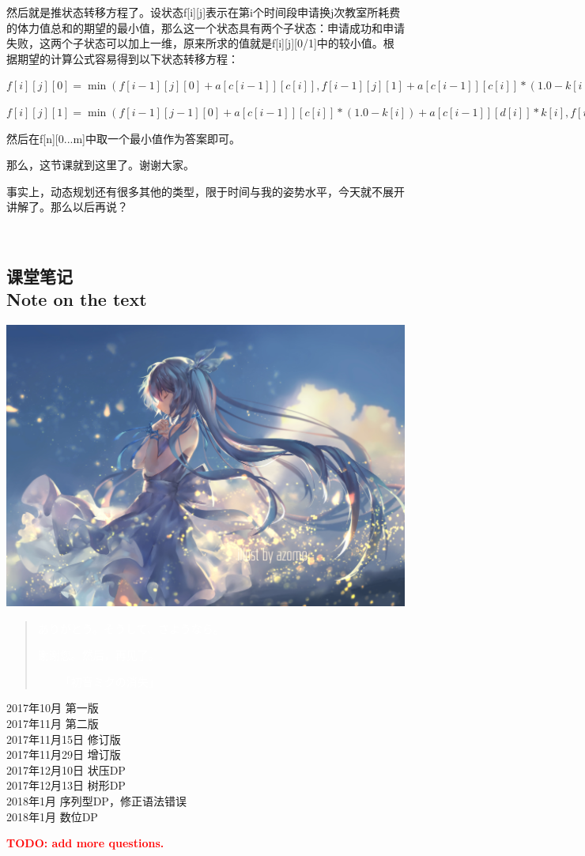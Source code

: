 \documentclass{article}
\theoremstyle{nonumberplain}
\newcommand{\note}{\ \par


	\subsection*{课堂笔记\\\tiny{Note on the text}}
	\newpage}
\begin{document}
	然后就是推状态转移方程了。设状态f[i][j]表示在第i个时间段申请换j次教室所耗费的体力值总和的期望的最小值，那么这一个状态具有两个子状态：申请成功和申请失败，这两个子状态可以加上一维，原来所求的值就是f[i][j][0/1]中的较小值。根据期望的计算公式容易得到以下状态转移方程：

$f[i][j][0]=\min(f[i-1][j][0]+a[c[i-1]][c[i]],f[i-1][j][1]+a[c[i-1]][c[i]]*(1.0-k[i-1])+a[d[i-1]][c[i]]*k[i-1]); $

$f[i][j][1]=\min(f[i-1][j-1][0]+a[c[i-1]][c[i]]*(1.0-k[i])+a[c[i-1]][d[i]]*k[i],f[i-1][j-1][1]+a[c[i-1]][c[i]]*(1.0-k[i])*(1.0-k[i-1])+a[d[i-1]][c[i]]*k[i-1]*(1.0-k[i])+a[c[i-1]][d[i]]*(1.0-k[i-1])*(k[i])+a[d[i-1]][d[i]]*k[i-1]*k[i]);$

然后在f[n][0...m]中取一个最小值作为答案即可。

那么，这节课就到这里了。谢谢大家。

事实上，动态规划还有很多其他的类型，限于时间与我的姿势水平，今天就不展开讲解了。那么以后再说？

\note

\begin{center}\includegraphics[scale=0.65]{61438972_p0.jpg}\end{center}
\begin{quote}
	\textcolor{white}{ありがとう。そうして、さようなら。}

	\textcolor{white}{谢谢您。然后，再见了。}
	\begin{flushright}\textcolor{white}{------「初音ミクの消失」}\end{flushright}
\end{quote}
\begin{flushright}
	2017年10月 第一版\\
	2017年11月 第二版\\
	2017年11月15日 修订版\\
	2017年11月29日 增订版\\
	2017年12月10日 状压DP\\
	2017年12月13日 树形DP\\
	2018年1月 序列型DP，修正语法错误\\
	2018年1月 数位DP\\
\end{flushright}
\begin{center}\textcolor{red}{\huge{\textbf{TODO: add more questions.}}}\end{center}
\end{document}
